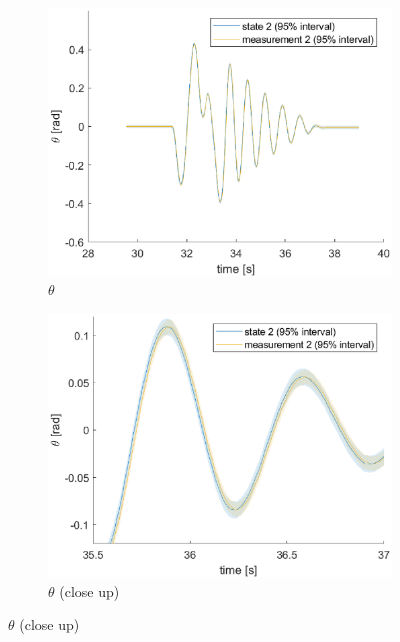 \documentclass[a4paper,kul]{kulakarticle} %
\begin{document}
\begin{figure}[htp!]
\begin{subfigure}[b]{0.48\textwidth}
		\includegraphics[width=\textwidth]{state2.eps}
		\caption{$\theta$}
	\end{subfigure}
	\hfill
	\begin{subfigure}[b]{0.48\textwidth}  
		\centering 
		\includegraphics[width=\textwidth]{state2_closeup.eps}
		\caption{$\theta$ (close up)}
	\end{subfigure}



\end{figure}
\end{document}
